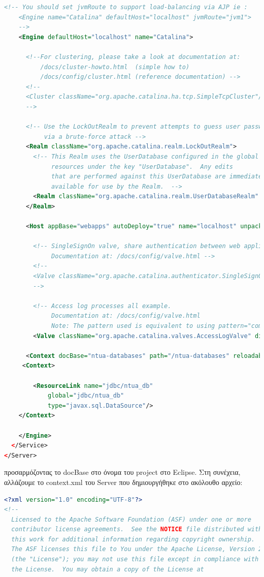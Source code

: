 \documentclass[a4paper,oneside, 11pt]{article}
\begin{document}
\begin{enumerate}
\begin{lstlisting}[language=XML]
    <!-- You should set jvmRoute to support load-balancing via AJP ie :
    <Engine name="Catalina" defaultHost="localhost" jvmRoute="jvm1">
    -->
    <Engine defaultHost="localhost" name="Catalina">

      <!--For clustering, please take a look at documentation at:
          /docs/cluster-howto.html  (simple how to)
          /docs/config/cluster.html (reference documentation) -->
      <!--
      <Cluster className="org.apache.catalina.ha.tcp.SimpleTcpCluster"/>
      -->

      <!-- Use the LockOutRealm to prevent attempts to guess user passwords
           via a brute-force attack -->
      <Realm className="org.apache.catalina.realm.LockOutRealm">
        <!-- This Realm uses the UserDatabase configured in the global JNDI
             resources under the key "UserDatabase".  Any edits
             that are performed against this UserDatabase are immediately
             available for use by the Realm.  -->
        <Realm className="org.apache.catalina.realm.UserDatabaseRealm" resourceName="UserDatabase"/>
      </Realm>

      <Host appBase="webapps" autoDeploy="true" name="localhost" unpackWARs="true">

        <!-- SingleSignOn valve, share authentication between web applications
             Documentation at: /docs/config/valve.html -->
        <!--
        <Valve className="org.apache.catalina.authenticator.SingleSignOn" />
        -->

        <!-- Access log processes all example.
             Documentation at: /docs/config/valve.html
             Note: The pattern used is equivalent to using pattern="common" -->
        <Valve className="org.apache.catalina.valves.AccessLogValve" directory="logs" pattern="%h %l %u %t &quot;%r&quot; %s %b" prefix="localhost_access_log" suffix=".txt"/>

      <Context docBase="ntua-databases" path="/ntua-databases" reloadable="true" source="org.eclipse.jst.jee.server:ntua-databases"/></Host>
     <Context>

		<ResourceLink name="jdbc/ntua_db"
			global="jdbc/ntua_db"
			type="javax.sql.DataSource"/>
	</Context> 
    
    </Engine>
  </Service>
</Server>
\end{lstlisting}
προσαρμόζοντας το docBase στο όνομα του project στο Eclipse. \bigbreak 
Στη συνέχεια, αλλάζουμε το context.xml του Server που δημιουργήθηκε στο ακόλουθο αρχείο:
\begin{lstlisting}[language=XML]
<?xml version="1.0" encoding="UTF-8"?>
<!--
  Licensed to the Apache Software Foundation (ASF) under one or more
  contributor license agreements.  See the NOTICE file distributed with
  this work for additional information regarding copyright ownership.
  The ASF licenses this file to You under the Apache License, Version 2.0
  (the "License"); you may not use this file except in compliance with
  the License.  You may obtain a copy of the License at


\end{lstlisting}
\end{enumerate}
\end{document}
